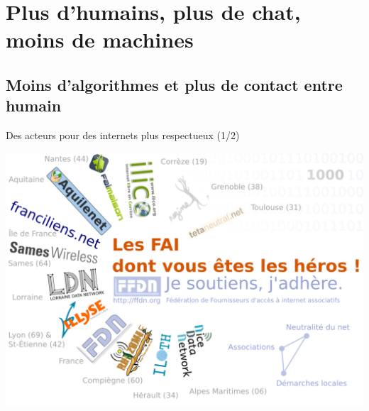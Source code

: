 \section[Plus d'humains, plus de chats, moins de machines]{Plus d'humains, plus de chat, moins de machines}

\subsection{Moins d'algorithmes et plus de contact entre humain}

\begin{frame}{Des acteurs pour des internets plus respectueux (1/2)}
  \begin{center}
    \includegraphics[height=0.8\textheight]{un_autre_internet/les_fai_dont_vous_etes.pdf}
  \end{center}
\end{frame}

